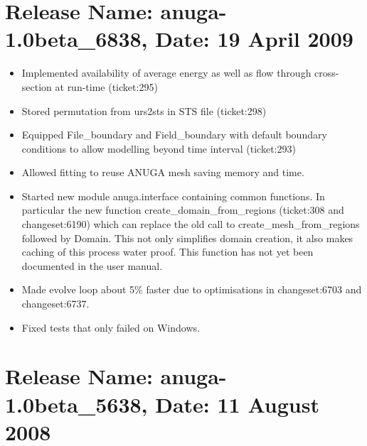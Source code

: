 \documentclass{manual}
\begin{document}
\section{Release Name: anuga-1.0beta\_6838, Date: 19 April 2009}
\begin{itemize}
  \item Implemented availability of average energy as well as flow 
  through cross-section at run-time (ticket:295)
  \item Stored permutation from urs2sts in STS file (ticket:298) 
  \item Equipped File\_boundary and Field\_boundary with default boundary
  conditions to allow modelling beyond time interval (ticket:293) 
  \item Allowed fitting to reuse ANUGA mesh saving memory and time.
  \item Started new module anuga.interface containing common functions. In particular the new function create\_domain\_from\_regions (ticket:308 and changeset:6190) which can replace the old call to create\_mesh\_from\_regions followed by Domain. This not only simplifies domain creation, it also makes caching of this process water proof. This function has not yet been documented in the user manual.
  \item Made evolve loop about 5\% faster due to optimisations in 
  changeset:6703 and changeset:6737.
  \item Fixed tests that only failed on Windows. 
\end{itemize} 


\section{Release Name: anuga-1.0beta\_5638, Date: 11 August 2008}
\end{document}
